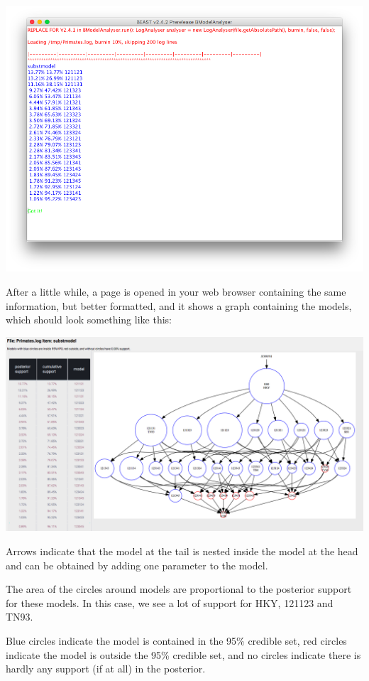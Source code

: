 \documentclass{article}
\begin{document}
\includegraphics[width=\textwidth]{bModelTest0}

After a little while, a page is opened in your web browser containing the same information, but better formatted, and it shows a graph containing the models, which should look something like this:

\includegraphics[width=\textwidth]{bModelTest}

Arrows indicate that the model at the tail is nested inside the model at the head and can be obtained by adding one parameter to the model.

The area of the circles around models are proportional to the posterior support for these models. In this case, we see a lot of support for HKY, 121123 and TN93.

Blue circles indicate the model is contained in the 95\% credible set, red circles indicate the model is outside the 95\% credible set, and no circles indicate there is hardly any support (if at all) in the posterior.



\end{document}
